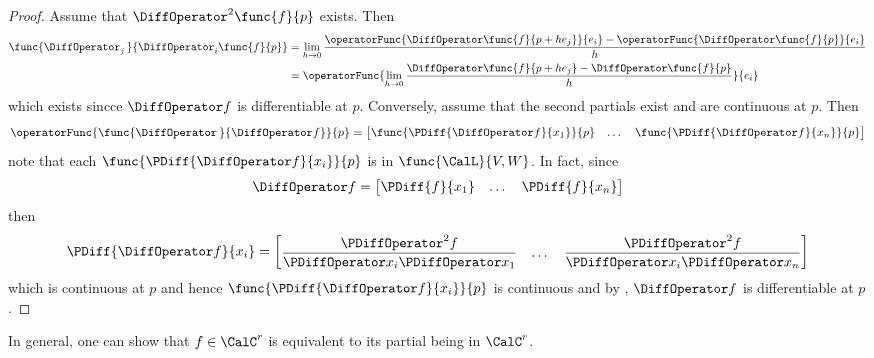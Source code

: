 \begin{proof}
    Assume that \(\DiffOperator^2 \func{f}{p}\) exists. Then
    \begin{align*}
        \func{\DiffOperator_j \,}{\DiffOperator_i \func{f}{p}} & = \lim_{h \to 0} \dfrac{\operatorFunc{\DiffOperator \func{f}{p + he_j}}{e_i} - \operatorFunc{\DiffOperator \func{f}{p}}{e_i} }{h} \\
                                                               & = \operatorFunc{ \lim_{h \to 0} \dfrac{\DiffOperator \func{f}{p + he_j} - \DiffOperator \func{f}{p}}{h} }{e_i}
    \end{align*}
    which exists sincce \(\DiffOperator f\) is differentiable at \(p\). Conversely, assume that the second partials exist and are continuous at \(p\). Then
    \begin{equation*}
        \operatorFunc{\func{\DiffOperator \,}{\DiffOperator f}}{p} = \begin{bmatrix}
            \func{\PDiff{\DiffOperator f}{x_1}}{p} & \dots & \func{\PDiff{\DiffOperator f}{x_n}}{p}
        \end{bmatrix}
    \end{equation*}
    note that each \(\func{\PDiff{\DiffOperator f}{x_i}}{p}\) is in \(\func{\CalL}{V,W}\). In fact, since
    \begin{equation*}
        \DiffOperator f = \begin{bmatrix}
            \PDiff{f}{x_1} & \dots & \PDiff{f}{x_n}
        \end{bmatrix}
    \end{equation*}
    then
    \begin{equation*}
        \PDiff{\DiffOperator f}{x_i} =  \begin{bmatrix}
            \dfrac{\PDiffOperator^2 f}{\PDiffOperator x_i \PDiffOperator x_1} & \dots & \dfrac{\PDiffOperator^2 f}{\PDiffOperator x_i \PDiffOperator x_n}
        \end{bmatrix}
    \end{equation*}
    which is continuous at \(p\) and hence \(\func{\PDiff{\DiffOperator f}{x_i}}{p}\) is continuous and by , \(\DiffOperator f\) is differentiable at \(p\).
\end{proof}

\begin{remark}
    In general, one can show that \(f \in \CalC^r\) is equivalent to its partial being in \(\CalC^r\).
\end{remark}

